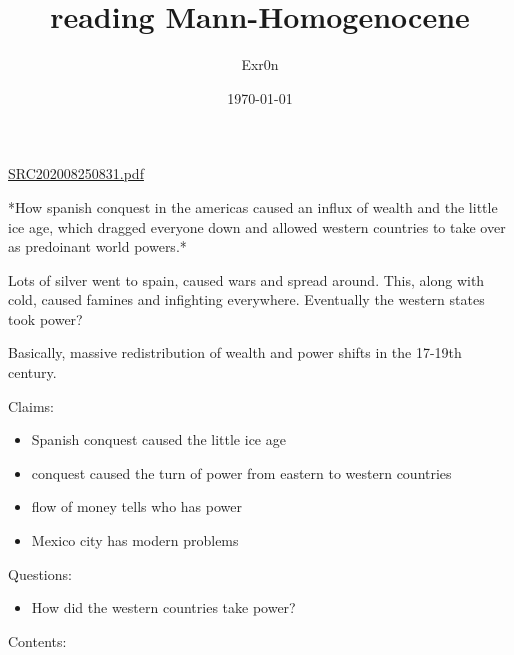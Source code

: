 \documentclass[letterpaper]{article}
\author{Exr0n}
\date{\today}
\title{reading Mann-Homogenocene}
\renewcommand{\tableofcontents}{}
\begin{document}
\tableofcontents

\href{SRC202008250831.pdf.org}{SRC202008250831.pdf}

*How spanish conquest in the americas caused an influx of wealth and the
little ice age, which dragged everyone down and allowed western
countries to take over as predoinant world powers.*

Lots of silver went to spain, caused wars and spread around. This, along
with cold, caused famines and infighting everywhere. Eventually the
western states took power?

Basically, massive redistribution of wealth and power shifts in the
17-19th century.

Claims:

\begin{itemize}
\item Spanish conquest caused the little ice age
\item conquest caused the turn of power from eastern to western countries
\item flow of money tells who has power
\item Mexico city has modern problems
\end{itemize}

Questions:

\begin{itemize}
\item How did the western countries take power?
\end{itemize}

Contents:
\end{document}
